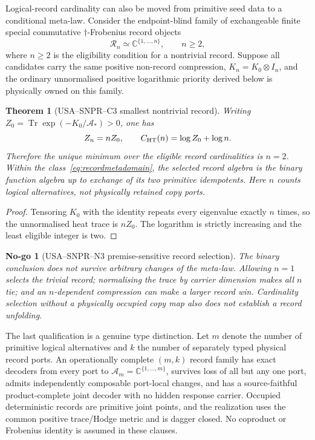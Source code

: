 \documentclass[11pt,a4paper]{article}
\newtheorem{theorem}[definition]{Theorem}
\newtheorem{nogo}[definition]{No-go}
\theoremstyle{remark}
\begin{document}
Logical-record cardinality can also be moved from primitive seed data to a
conditional meta-law.  Consider the endpoint-blind family of exchangeable finite
special commutative $\dagger$-Frobenius record objects
\begin{equation}
 \mathcal R_n\simeq\mathbb C^{\{1,\ldots,n\}},\qquad n\ge2,
 \label{eq:recordmetadomain}
\end{equation}
where $n\ge2$ is the eligibility condition for a nontrivial record.  Suppose
all candidates carry the same positive non-record compression,
$K_n=K_0\otimes I_n$, and the ordinary unnormalised positive logarithmic
priority derived below is physically owned on this family.

\begin{theorem}[USA--SNPR--C3 smallest nontrivial record]
Writing $Z_0=\operatorname{Tr}\exp(-K_0/\mathcal A_*)>0$, one has
\begin{equation}
 Z_n=nZ_0,
 \qquad
 C_{\rm HT}(n)=\log Z_0+\log n.
 \label{eq:recordpriority}
\end{equation}
Therefore the unique minimum over the eligible record cardinalities is
$n=2$.  Within the class~\eqref{eq:recordmetadomain}, the selected record
algebra is the binary function algebra up to exchange of its two primitive
idempotents.  Here $n$ counts logical alternatives, not physically retained
copy ports.
\label{thm:snprrecordtwo}
\end{theorem}

\begin{proof}
Tensoring $K_0$ with the identity repeats every eigenvalue exactly $n$ times,
so the unnormalised heat trace is $nZ_0$.  The logarithm is strictly increasing
and the least eligible integer is two.
\end{proof}

\begin{nogo}[USA--SNPR--N3 premise-sensitive record selection]
The binary conclusion does not survive arbitrary changes of the meta-law.
Allowing $n=1$ selects the trivial record; normalising the trace by carrier
dimension makes all $n$ tie; and an $n$-dependent compression can make a
larger record win.  Cardinality selection without a physically occupied copy
map also does not establish a record unfolding.
\label{nogo:snprrecordcontrols}
\end{nogo}

The last qualification is a genuine type distinction.  Let $m$ denote the
number of primitive logical alternatives and $k$ the number of separately
typed physical record ports.  An operationally complete $(m,k)$ record family
has exact decoders from every port to
$\mathcal A_m=\mathbb C^{\{1,\ldots,m\}}$, survives loss of all but any one
port, admits independently composable port-local changes, and has a
source-faithful product-complete joint decoder with no hidden response
carrier.  Occupied deterministic records are primitive joint points, and the
realization uses the common positive trace/Hodge metric and is dagger closed.
No coproduct or Frobenius identity is assumed in these clauses.
\end{document}
